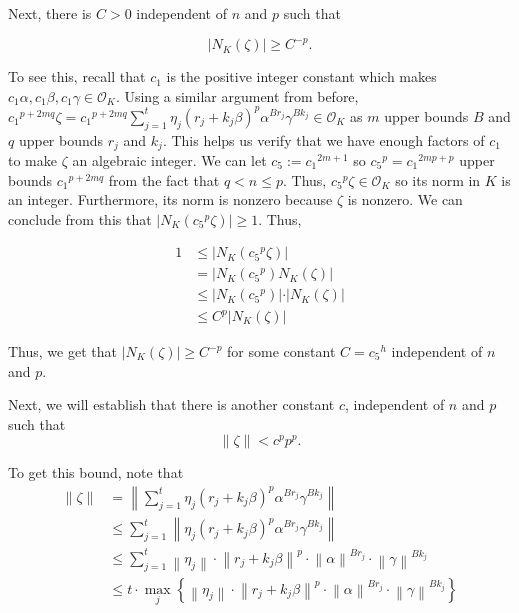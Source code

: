 \documentclass[a4paper, 11pt]{book}
\begin{document}
Next, there is $C > 0$ independent of $n$ and $p$ such that 

\[\vert N_{K}(\zeta) \vert \geq C^{-p}.\]

To see this, recall that $c_1$ is the positive integer constant which makes $c_1\alpha, c_1\beta, c_1\gamma \in \mathcal{O}_K$. Using a similar argument from before, ${c_1}^{p+2mq} \zeta = {c_1}^{p + 2mq}\sum\limits_{j=1}^{t}{\eta_{j}\left(r_j + k_j \beta\right)}^{p}{\alpha}^{Br_{j}}{\gamma}^{Bk_{j}} \in \mathcal{O}_K$ as $m$ upper bounds $B$ and $q$ upper bounds $r_j$ and $k_j$. This helps us verify that we have enough factors of $c_1$ to make $\zeta$ an algebraic integer. We can let $c_5 := {c_1}^{2m+1}$ so ${c_5}^p = {c_1}^{2mp + p}$ upper bounds ${c_1}^{p + 2mq}$ from the fact that $q < n \leq p$. Thus, ${c_5}^{p}\zeta \in \mathcal{O}_K$ so its norm in $K$ is an integer. Furthermore, its norm is nonzero because $\zeta$ is nonzero.  We can conclude from this that $\vert N_K({c_5}^{p}\zeta) \vert \geq 1$. Thus,

\begin{align*}
    1 &\leq \vert N_K({c_5}^{p}\zeta) \vert \\
      &= \vert N_K({c_5}^{p}) N_K(\zeta) \vert \\
      &\leq \vert N_K({c_5}^{p}) \vert \cdot \vert N_K(\zeta) \vert \\
      & \leq C^{p}\vert N_K(\zeta) \vert
\end{align*}

Thus, we get that $\vert N_K(\zeta) \vert \geq C^{-p}$ for some constant $C = {c_5}^{h}$ independent of $n$ and $p$.\par

Next, we will establish that there is another constant $c$, independent of $n$ and $p$ such that \[\| \zeta \| < c^{p}p^{p}.\]

To get this bound, note that 
\begin{align*}
    \| \zeta \| &= \left\| \sum\limits_{j=1}^{t} \eta_{j}{\left(r_j + k_j \beta\right)}^{p}{\alpha}^{Br_{j}}{\gamma}^{Bk_{j}} \right\| \\
                &\leq \sum\limits_{j=1}^{t} \left\| \eta_{j}{\left(r_j + k_j \beta\right)}^{p}{\alpha}^{Br_{j}}{\gamma}^{Bk_{j}} \right\| \\
                &\leq \sum\limits_{j=1}^{t} \left\| \eta_{j} \right\| \cdot {\left\| r_j + k_j \beta \right\|}^{p} \cdot  {\left\| \alpha \right\|}^{Br_{j}}  \cdot  {\left\| \gamma \right\|}^{Bk_{j}}  \\
                &\leq t \cdot \max_{j} \left\{ \left\| \eta_{j} \right\| \cdot {\left\| r_j + k_j \beta \right\|}^{p} \cdot  {\left\| \alpha \right\|}^{Br_{j}}  \cdot  {\left\| \gamma \right\|}^{Bk_{j}} \right\}
\end{align*}
\end{document}
